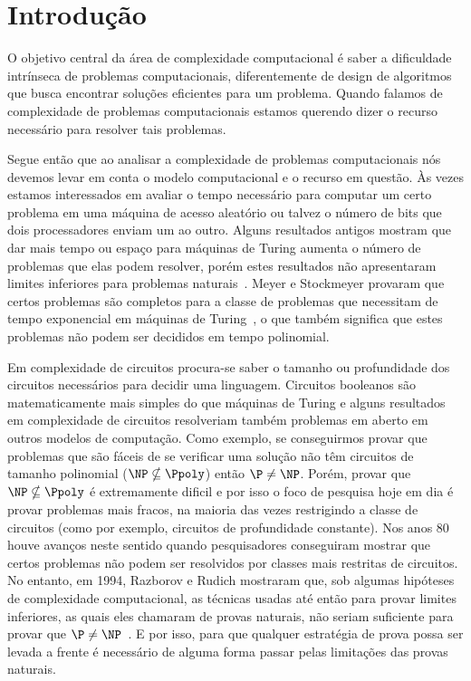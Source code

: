 \chapter{Introdução} \label{chapter_introduction}

O objetivo central da área de complexidade computacional é saber a dificuldade intrínseca de problemas computacionais, diferentemente de design de algoritmos que busca encontrar soluções eficientes para um problema. Quando falamos de complexidade de problemas computacionais estamos querendo dizer o recurso necessário para resolver tais problemas. 

Segue então que ao analisar a complexidade de problemas computacionais nós devemos levar em conta o modelo computacional e o recurso em questão. Às vezes estamos interessados em avaliar o tempo necessário para computar um certo problema em uma máquina de acesso aleatório ou talvez o número de bits que dois processadores enviam um ao outro. Alguns resultados antigos mostram que dar mais tempo ou espaço para máquinas de Turing aumenta o número de problemas que elas podem resolver, porém estes resultados não apresentaram limites inferiores para problemas naturais~\cite{arora2009computational}. Meyer e Stockmeyer provaram que certos problemas são completos para a classe de problemas que necessitam de tempo exponencial em máquinas de Turing~\cite{beyondNP}, o que também significa que estes problemas não podem ser decididos em tempo polinomial.

Em complexidade de circuitos procura-se saber o tamanho ou profundidade dos circuitos necessários para decidir uma linguagem. Circuitos booleanos são matematicamente mais simples do que máquinas de Turing e alguns resultados em complexidade de circuitos resolveriam também problemas em aberto em outros modelos de computação. Como exemplo, se conseguirmos provar que problemas que são fáceis de se verificar uma solução não têm circuitos de tamanho polinomial ($\NP \nsubseteq \Ppoly$) então $\P \neq \NP$. Porém, provar que $\NP \nsubseteq \Ppoly$ é extremamente dificil e por isso o foco de pesquisa hoje em dia é provar problemas mais fracos, na maioria das vezes restrigindo a classe de circuitos (como por exemplo, circuitos de profundidade constante). Nos anos 80 houve avanços neste sentido quando pesquisadores conseguiram mostrar que certos problemas não podem ser resolvidos por classes mais restritas de circuitos. No entanto, em 1994, Razborov e Rudich mostraram que, sob algumas hipóteses de complexidade computacional, as técnicas usadas até então para provar limites inferiores, as quais eles chamaram de provas naturais, não seriam suficiente para provar que $\P \neq \NP$~\cite{natural}. E por isso, para que qualquer estratégia de prova possa ser levada a frente é necessário de alguma forma passar pelas limitações das provas naturais.

